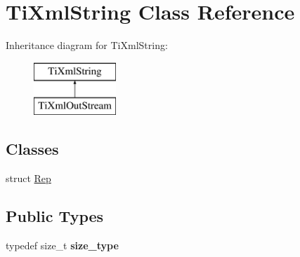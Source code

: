 \hypertarget{classTiXmlString}{
\section{\-Ti\-Xml\-String \-Class \-Reference}
\label{d1/d15/classTiXmlString}
}
\-Inheritance diagram for \-Ti\-Xml\-String\-:\begin{figure}[H]
\begin{center}
\leavevmode
\includegraphics[height=2.000000cm]{d1/d15/classTiXmlString}
\end{center}
\end{figure}
\subsection*{\-Classes}
\begin{DoxyCompactItemize}
\item 
struct \hyperlink{structTiXmlString_1_1Rep}{\-Rep}
\end{DoxyCompactItemize}
\subsection*{\-Public \-Types}
\begin{DoxyCompactItemize}
\item 
\hypertarget{classTiXmlString_abeb2c1893a04c17904f7c06546d0b971}{
typedef size\-\_\-t {\bfseries size\-\_\-type}}
\label{d1/d15/classTiXmlString_abeb2c1893a04c17904f7c06546d0b971}

\end{DoxyCompactItemize}
